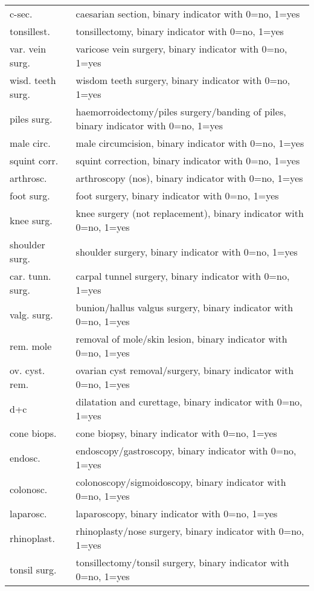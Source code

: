 \begin{longtable}[c]{lp{8cm}}
        c-sec.	&	caesarian section, binary indicator with 0=no, 1=yes	\\
        tonsillest.	&	tonsillectomy, binary indicator with 0=no, 1=yes	\\
        var. vein surg.	&	varicose vein surgery, binary indicator with 0=no, 1=yes	\\
        wisd. teeth surg.	&	wisdom teeth surgery, binary indicator with 0=no, 1=yes	\\
        piles surg.	&	haemorroidectomy/piles surgery/banding of piles, binary indicator with 0=no, 1=yes	\\
        male circ.	&	male circumcision, binary indicator with 0=no, 1=yes	\\
        squint corr.	&	squint correction, binary indicator with 0=no, 1=yes	\\
        arthrosc.	&	arthroscopy (nos), binary indicator with 0=no, 1=yes	\\
        foot surg.	&	foot surgery, binary indicator with 0=no, 1=yes	\\
        knee surg.	&	knee surgery (not replacement), binary indicator with 0=no, 1=yes	\\
        shoulder surg.	&	shoulder surgery, binary indicator with 0=no, 1=yes	\\
        car. tunn. surg.	&	carpal tunnel surgery, binary indicator with 0=no, 1=yes	\\
        valg. surg.	&	bunion/hallus valgus surgery, binary indicator with 0=no, 1=yes	\\
        rem. mole	&	removal of mole/skin lesion, binary indicator with 0=no, 1=yes	\\
        ov. cyst. rem.	&	ovarian cyst removal/surgery, binary indicator with 0=no, 1=yes	\\
        d+c	&	dilatation and curettage, binary indicator with 0=no, 1=yes	\\
        cone biops.	&	cone biopsy, binary indicator with 0=no, 1=yes	\\
        endosc.	&	endoscopy/gastroscopy, binary indicator with 0=no, 1=yes	\\
        colonosc.	&	colonoscopy/sigmoidoscopy, binary indicator with 0=no, 1=yes	\\
        laparosc.	&	laparoscopy, binary indicator with 0=no, 1=yes	\\
        rhinoplast.	&	rhinoplasty/nose surgery, binary indicator with 0=no, 1=yes	\\
        tonsil surg.	&	tonsillectomy/tonsil surgery, binary indicator with 0=no, 1=yes	\\

\end{longtable}
